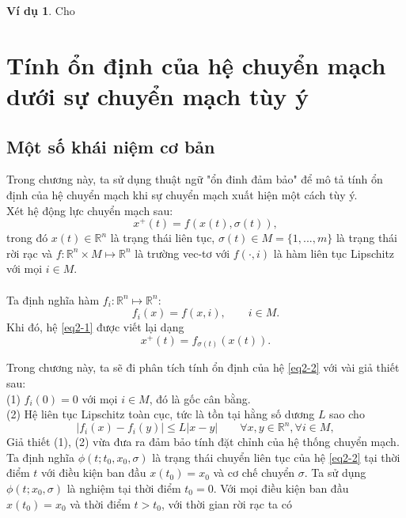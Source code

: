 \documentclass[14pt,a4paper,oneside]{report}		%
\theoremstyle{definition}
\newtheorem{example}[theorem]{Ví dụ}
\begin{document}
\begin{example}
Cho 
\end{example}

\chapter{Tính ổn định của hệ chuyển mạch dưới sự chuyển mạch tùy ý}
\section{Một số khái niệm cơ bản}
Trong chương này, ta sử dụng thuật ngữ "ổn đinh đảm bảo" để mô tả tính ổn định của hệ chuyển mạch khi sự chuyển mạch xuất hiện một cách tùy ý.\\

Xét hệ động lực chuyển mạch sau:
\begin{equation} \label{eq2-1}
x^+(t)=f(x(t),\sigma (t)),
\end{equation}
trong đó $x(t)\in\mathbb{R}^n$ là trạng thái liên tục, $\sigma (t)\in M = \{1,...,m\}$ là trạng thái rời rạc và $f : \mathbb{R}^n \times M \mapsto \mathbb{R}^n$ là trường vec-tơ với $f(\cdot ,i)$ là hàm liên tục Lipschitz với mọi $i\in M$.\\\\
Ta định nghĩa hàm $f_i : \mathbb{R}^n \mapsto \mathbb{R}^n$:
$$f_i(x)=f(x,i), \qquad i\in M.$$
Khi đó, hệ \ref{eq2-1} được viết lại dạng
\begin{equation} \label{eq2-2}
x^+(t)=f_{\sigma (t)}(x(t)).
\end{equation}

Trong chương này, ta sẽ đi phân tích tính ổn định của hệ \ref{eq2-2} với vài giả thiết sau:\\
(1) $f_i(0)=0$ với mọi $i\in M$, đó là gốc cân bằng.\\
(2) Hệ liên tục Lipschitz toàn cục, tức là tồn tại hằng số dương $L$ sao cho
\begin{equation} \label{eq2-3}
|f_i(x)-f_i(y)|\leq L|x-y|\qquad \forall x,y \in \mathbb{R}^n,\forall i\in M,
\end{equation}
Giả thiết (1), (2) vừa đưa ra đảm bảo tính đặt chỉnh của hệ thống chuyển mạch.\\
Ta định nghĩa $\phi (t;t_0,x_0,\sigma)$ là trạng thái chuyển liên tục của hệ \ref{eq2-2} tại thời điểm $t$ với điều kiện ban đầu $x(t_0)=x_0$ và cơ chế chuyển $\sigma$. Ta sử dụng $\phi (t;x_0,\sigma)$ là nghiệm tại thời điểm $t_0 = 0$. Với mọi điều kiện ban đầu $x(t_0)=x_0$ và thời điểm $t>t_0$, với thời gian rời rạc ta có
\end{document}
